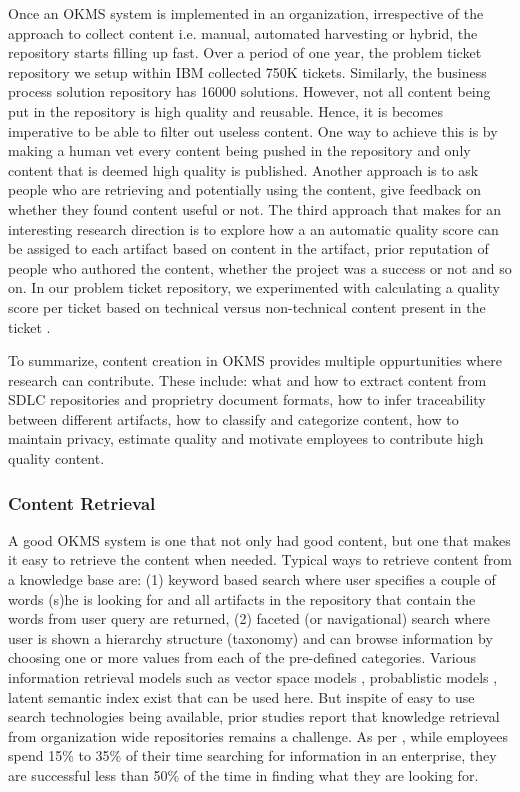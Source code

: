 Once an OKMS system is implemented in an organization, irrespective of the approach to collect content i.e. manual, automated harvesting or hybrid, the repository starts filling up fast. Over a period of one year, the problem ticket repository we setup within IBM collected 750K tickets. Similarly, the business process solution repository has 16000 solutions. However, not all content being put in the repository is high quality and reusable. Hence, it is becomes imperative to be able to filter out useless content. One way to achieve this is by making a human vet every content being pushed in the repository and only content that is deemed high quality is published. Another approach is to ask people who are retrieving and potentially using the content, give feedback on whether they found content useful or not. The third approach that makes for an interesting research direction is to explore how a an automatic quality score can be assiged to each artifact based on content in the artifact, prior reputation of people who authored the content, whether the project was a success or not and so on. In our problem ticket repository, we experimented with calculating a quality score per ticket based on technical versus non-technical content present in the ticket \cite{}.

To summarize, content creation in OKMS provides multiple oppurtunities where research can contribute. These include: what and how to extract content from SDLC repositories and proprietry document formats, how to infer traceability between different artifacts, how to classify and categorize content, how to maintain privacy, estimate quality and motivate employees to contribute high quality content. 

\subsubsection{Content Retrieval}

A good OKMS system is one that not only had good content, but one that makes it easy to retrieve the content when needed. Typical ways to retrieve content from a knowledge base are: (1) keyword based search where user specifies a couple of words (s)he is looking for and all artifacts in the repository that contain the words from user query are returned, (2) faceted (or navigational) search where user is shown a hierarchy structure (taxonomy) and can browse information by choosing one or more values from each of the pre-defined categories. Various information retrieval models such as vector space models \cite{}, probablistic models \cite{}, latent semantic index \cite{} exist that can be used here. But inspite of easy to use search technologies being available, prior studies report that knowledge retrieval from organization wide repositories remains a challenge. As per \cite{}, while employees spend 15\% to 35\% of their time searching for information in an enterprise, they are successful less than 50\% of the time \cite{} in finding what they are looking for. 

